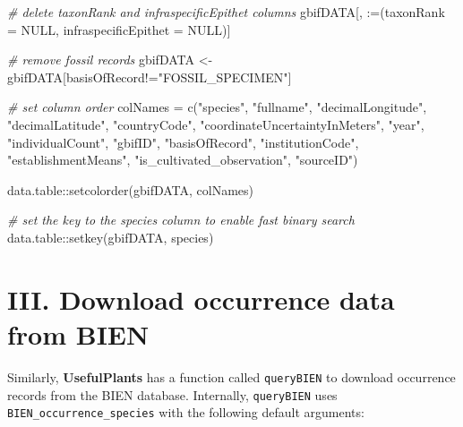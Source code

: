 \documentclass[
]{article}
\newenvironment{Shaded}{\begin{snugshade}}{\end{snugshade}}
\newcommand{\AttributeTok}[1]{\textcolor[rgb]{0.77,0.63,0.00}{#1}}
\newcommand{\CommentTok}[1]{\textcolor[rgb]{0.56,0.35,0.01}{\textit{#1}}}
\newcommand{\ConstantTok}[1]{\textcolor[rgb]{0.00,0.00,0.00}{#1}}
\newcommand{\FunctionTok}[1]{\textcolor[rgb]{0.00,0.00,0.00}{#1}}
\newcommand{\NormalTok}[1]{#1}
\newcommand{\OtherTok}[1]{\textcolor[rgb]{0.56,0.35,0.01}{#1}}
\newcommand{\SpecialCharTok}[1]{\textcolor[rgb]{0.00,0.00,0.00}{#1}}
\newcommand{\StringTok}[1]{\textcolor[rgb]{0.31,0.60,0.02}{#1}}
\begin{document}
\begin{Shaded}
\begin{Highlighting}[]
\CommentTok{\# delete taxonRank and infraspecificEpithet columns}
\NormalTok{gbifDATA[, }\StringTok{\textasciigrave{}}\AttributeTok{:=}\StringTok{\textasciigrave{}}\NormalTok{(}\AttributeTok{taxonRank =} \ConstantTok{NULL}\NormalTok{, }\AttributeTok{infraspecificEpithet =} \ConstantTok{NULL}\NormalTok{)]}

\CommentTok{\# remove fossil records}
\NormalTok{gbifDATA }\OtherTok{\textless{}{-}}\NormalTok{ gbifDATA[basisOfRecord}\SpecialCharTok{!=}\StringTok{"FOSSIL\_SPECIMEN"}\NormalTok{]}

\CommentTok{\# set column order}
\NormalTok{colNames }\OtherTok{=} \FunctionTok{c}\NormalTok{(}\StringTok{"species"}\NormalTok{,}
             \StringTok{"fullname"}\NormalTok{,}
             \StringTok{"decimalLongitude"}\NormalTok{,}
             \StringTok{"decimalLatitude"}\NormalTok{,}
             \StringTok{"countryCode"}\NormalTok{,}
             \StringTok{"coordinateUncertaintyInMeters"}\NormalTok{,}
             \StringTok{"year"}\NormalTok{,}
             \StringTok{"individualCount"}\NormalTok{,}
             \StringTok{"gbifID"}\NormalTok{,}
             \StringTok{"basisOfRecord"}\NormalTok{,}
             \StringTok{"institutionCode"}\NormalTok{,}
             \StringTok{"establishmentMeans"}\NormalTok{,}
             \StringTok{"is\_cultivated\_observation"}\NormalTok{,}
             \StringTok{"sourceID"}\NormalTok{)}

\NormalTok{data.table}\SpecialCharTok{::}\FunctionTok{setcolorder}\NormalTok{(gbifDATA, colNames)}

\CommentTok{\# set the key to the species column to enable fast binary search}
\NormalTok{data.table}\SpecialCharTok{::}\FunctionTok{setkey}\NormalTok{(gbifDATA, }\StringTok{\textquotesingle{}species\textquotesingle{}}\NormalTok{)}
\end{Highlighting}
\end{Shaded}

\hypertarget{iii.-download-occurrence-data-from-bien}{%
\section{III. Download occurrence data from
BIEN}\label{iii.-download-occurrence-data-from-bien}}

Similarly, \textbf{UsefulPlants} has a function called
\texttt{queryBIEN} to download occurrence records from the BIEN
database. Internally, \texttt{queryBIEN} uses
\texttt{BIEN\_occurrence\_species} with the following default arguments:
\end{document}
